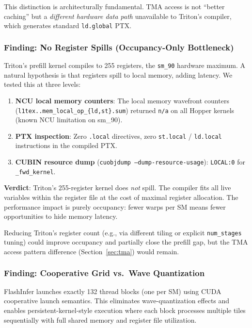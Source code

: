\documentclass[10pt,twocolumn]{article}
\begin{document}
This distinction is architecturally fundamental.  TMA access is not ``better caching'' but a \emph{different hardware data path} unavailable to Triton's compiler, which generates standard \texttt{ld.global} PTX.

\subsubsection{Finding: No Register Spills (Occupancy-Only Bottleneck)}
\label{sec:spills}

Triton's prefill kernel compiles to 255 registers, the \texttt{sm\_90} hardware maximum.  A natural hypothesis is that registers spill to local memory, adding latency.  We tested this at three levels:

\begin{enumerate}[leftmargin=*,topsep=0pt]
  \item \textbf{NCU local memory counters}: The local memory wavefront counters (\texttt{l1tex..mem\_local\_op\_\allowbreak\{ld,st\}.sum}) returned \texttt{n/a} on all Hopper kernels (known NCU limitation on sm\_90).
  \item \textbf{PTX inspection}: Zero \texttt{.local} directives, zero \texttt{st.local} / \texttt{ld.local} instructions in the compiled PTX.
  \item \textbf{CUBIN resource dump} (\texttt{cuobjdump --dump-resource-usage}): \texttt{LOCAL:0} for \texttt{\_fwd\_kernel}.
\end{enumerate}

\textbf{Verdict}: Triton's 255-register kernel does \emph{not} spill.  The compiler fits all live variables within the register file at the cost of maximal register allocation.  The performance impact is purely occupancy: fewer warps per SM means fewer opportunities to hide memory latency.

Reducing Triton's register count (e.g., via different tiling or explicit \texttt{num\_stages} tuning) could improve occupancy and partially close the prefill gap, but the TMA access pattern difference (Section~\ref{sec:tma}) would remain.

\subsubsection{Finding: Cooperative Grid vs.\ Wave Quantization}

FlashInfer launches exactly 132 thread blocks (one per SM) using CUDA cooperative launch semantics.  This eliminates wave-quantization effects and enables persistent-kernel-style execution where each block processes multiple tiles sequentially with full shared memory and register file utilization.
\end{document}
